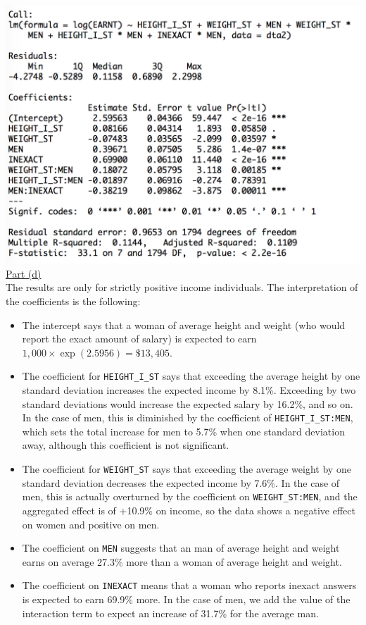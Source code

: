 \documentclass[a4paper, 11pt]{article}
\begin{document}
\includegraphics[scale=0.7]{reg4.png}
\newline \\
\newline \underline{Part (d)}\\
\newline The results are only for strictly positive income individuals. The interpretation of the coefficients is the following:
\begin{itemize}
\item The intercept says that a woman of average height and weight (who would report the exact amount of salary) is expected to earn $1,000 \times \exp{(2.5956)} = \$13,405$.
\item The coefficient for \texttt{HEIGHT\_I\_ST} says that exceeding the average height by one standard deviation increases the expected income by 8.1\%. Exceeding by two standard deviations would increase the expected salary by 16.2\%, and so on. In the case of men, this is diminished by the coefficient of \texttt{HEIGHT\_I\_ST:MEN}, which sets the total increase for men to 5.7\% when one standard deviation away, although this coefficient is not significant.
\item The coefficient for \texttt{WEIGHT\_ST} says that exceeding the average weight by one standard deviation decreases the expected income by 7.6\%. In the case of men, this is actually overturned by the coefficient on \texttt{WEIGHT\_ST:MEN}, and the aggregated effect is of +10.9\% on income, so the data shows a negative effect on women and positive on men.
\item The coefficient on \texttt{MEN} suggests that an man of average height and weight earns on average 27.3\% more than a woman of average height and weight.
\item The coefficient on \texttt{INEXACT} means that a woman who reports inexact answers is expected to earn 69.9\% more. In the case of men, we add the value of the interaction term to expect an increase of 31.7\% for the average man.
\end{itemize}
\end{document}
